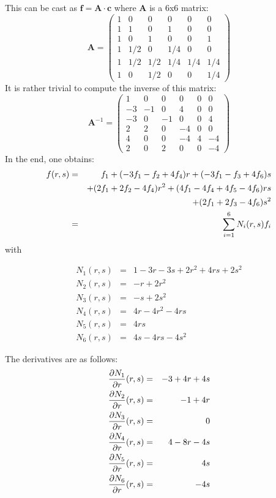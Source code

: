 This can be cast as ${\bm f}={\bm A}\cdot {\bm c}$ where ${\bm A}$ is a 6x6 matrix:
\[
{\bm A}=
\left(
\begin{array}{cccccc}
1&0   &  0  & 0   & 0   & 0\\
1&1   &  0  & 1   & 0   & 0\\
1&0   &  1  & 0   & 0   & 1\\
1&1/2 &  0  & 1/4 & 0   & 0\\
1&1/2 &  1/2& 1/4 & 1/4 & 1/4\\
1&0   &  1/2& 0   & 0   & 1/4
\end{array}
\right)
\]
It is rather trivial to compute the inverse of this matrix:
\[
{\bm A}^{-1}=
\left(
\begin{array}{cccccc}
1  & 0 & 0  & 0  & 0 & 0  \\
-3 & -1& 0  & 4  & 0 & 0 \\
-3 & 0 & -1 & 0  & 0 & 4 \\
2  & 2 & 0  & -4 & 0 & 0  \\
4  & 0 & 0  & -4 & 4 & -4 \\
2  & 0 & 2  & 0  & 0 & -4
\end{array}
\right)
\]
In the end, one obtains:
\begin{eqnarray}
f(r,s) 
&=& f_1 + (-3f_1-f_2+4f_4) r + (-3f_1-f_3+4f_6)s \nonumber\\
&& +(2f_1+2f_2-4f_4)r^2 + (4f_1-4f_4+4f_5-4f_6) rs \nonumber\\
&&+ (2f_1+2f_3-4f_6)s^2 \nonumber\\
&=& \sum_{i=1}^6 N_i(r,s) f_i
\end{eqnarray}
with
\begin{mdframed}[backgroundcolor=blue!5]
\begin{eqnarray}
N_1(r,s) &=& 1-3r-3s+2r^2+4rs+2s^2 \nonumber\\
N_2(r,s) &=& -r+2r^2 \nonumber\\
N_3(r,s) &=& -s+2s^2 \nonumber\\
N_4(r,s) &=& 4r-4r^2-4rs \nonumber\\
N_5(r,s) &=& 4rs \nonumber\\
N_6(r,s) &=& 4s-4rs-4s^2 \nonumber
\end{eqnarray}
\end{mdframed}

The derivatives are as follows:
\begin{eqnarray}
\frac{\partial N_1}{\partial r}(r,s) &=&  -3+4r+4s \nonumber\\ 
\frac{\partial N_2}{\partial r}(r,s) &=&  -1+4r\nonumber\\ 
\frac{\partial N_3}{\partial r}(r,s) &=&  0\nonumber\\ 
\frac{\partial N_4}{\partial r}(r,s) &=&  4-8r-4s\nonumber\\ 
\frac{\partial N_5}{\partial r}(r,s) &=&  4s\nonumber\\ 
\frac{\partial N_6}{\partial r}(r,s) &=&  -4s\nonumber
\end{eqnarray}

